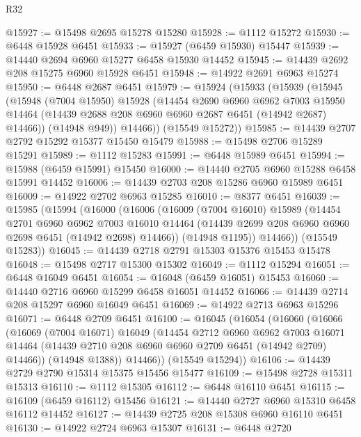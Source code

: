 \begin{lexlean}{R32}
\begin{coremodule}
@15927 := @15498 @2695 @15278 @15280
@15928 := @1112 @15272
@15930 := @6448 @15928 @6451
@15933 := @15927 (@6459 @15930) @15447
@15939 := @14440 @2694 @6960 @15277 @6458 @15930 @14452
@15945 := @14439 @2692 @208 @15275 @6960 @15928 @6451
@15948 := @14922 @2691 @6963 @15274
@15950 := @6448 @2687 @6451
@15979 := @15924
    (@15933
      (@15939
        (@15945
          (@15948
            (@7004 @15950)
            @15928
            (@14454
              @2690
              @6960
              @6962
              @7003
              @15950
              @14464
              (@14439 @2688 @208 @6960 @6960 @2687 @6451 (@14942 @2687) @14466))
            (@14948 @949))
          @14466))
      (@15549 @15272))
@15985 := @14439 @2707 @2792 @15292 @15377 @15450 @15479
@15988 := @15498 @2706 @15289 @15291
@15989 := @1112 @15283
@15991 := @6448 @15989 @6451
@15994 := @15988 (@6459 @15991) @15450
@16000 := @14440 @2705 @6960 @15288 @6458 @15991 @14452
@16006 := @14439 @2703 @208 @15286 @6960 @15989 @6451
@16009 := @14922 @2702 @6963 @15285
@16010 := @8377 @6451
@16039 := @15985
    (@15994
      (@16000
        (@16006
          (@16009
            (@7004 @16010)
            @15989
            (@14454
              @2701
              @6960
              @6962
              @7003
              @16010
              @14464
              (@14439 @2699 @208 @6960 @6960 @2698 @6451 (@14942 @2698) @14466))
            (@14948 @1195))
          @14466))
      (@15549 @15283))
@16045 := @14439 @2718 @2791 @15303 @15376 @15453 @15478
@16048 := @15498 @2717 @15300 @15302
@16049 := @1112 @15294
@16051 := @6448 @16049 @6451
@16054 := @16048 (@6459 @16051) @15453
@16060 := @14440 @2716 @6960 @15299 @6458 @16051 @14452
@16066 := @14439 @2714 @208 @15297 @6960 @16049 @6451
@16069 := @14922 @2713 @6963 @15296
@16071 := @6448 @2709 @6451
@16100 := @16045
    (@16054
      (@16060
        (@16066
          (@16069
            (@7004 @16071)
            @16049
            (@14454
              @2712
              @6960
              @6962
              @7003
              @16071
              @14464
              (@14439 @2710 @208 @6960 @6960 @2709 @6451 (@14942 @2709) @14466))
            (@14948 @1388))
          @14466))
      (@15549 @15294))
@16106 := @14439 @2729 @2790 @15314 @15375 @15456 @15477
@16109 := @15498 @2728 @15311 @15313
@16110 := @1112 @15305
@16112 := @6448 @16110 @6451
@16115 := @16109 (@6459 @16112) @15456
@16121 := @14440 @2727 @6960 @15310 @6458 @16112 @14452
@16127 := @14439 @2725 @208 @15308 @6960 @16110 @6451
@16130 := @14922 @2724 @6963 @15307
@16131 := @6448 @2720

\end{coremodule}
\end{lexlean}
